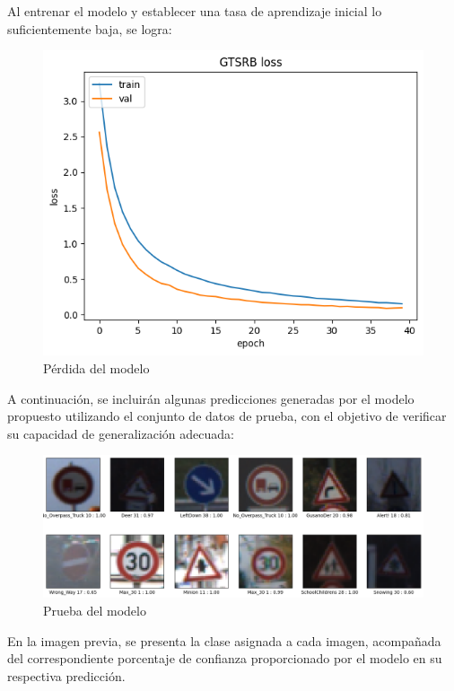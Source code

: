     Al entrenar el modelo y establecer una tasa de aprendizaje inicial lo suficientemente baja, se logra:

    \begin{figure}[ht]
	    \centering
		\includegraphics[scale=0.45]{img/GTSRB_Loss.png}
		\caption{Pérdida del modelo}
	\end{figure}
    
    A continuación, se incluirán algunas predicciones generadas por el modelo propuesto utilizando el conjunto de datos de prueba, con el objetivo de verificar su capacidad de generalización adecuada:
    
    \begin{figure}[ht]
	    \centering
		\includegraphics[scale=0.3]{img/GTSRB_Pred.png}
		\caption{Prueba del modelo}
	\end{figure}

    En la imagen previa, se presenta la clase asignada a cada imagen, acompañada del correspondiente porcentaje de confianza proporcionado por el modelo en su respectiva predicción.


